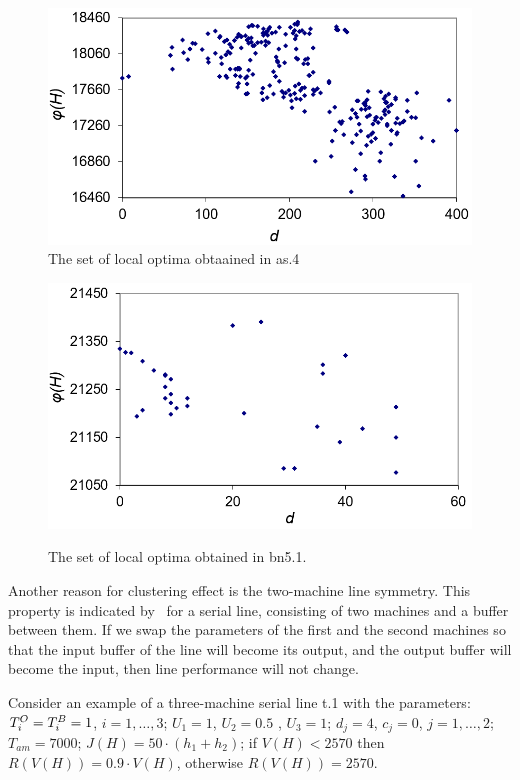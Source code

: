 \documentclass{ifacconf}
\begin{document}
 \begin{figure}[h!]
	\centering
	\includegraphics[scale=0.5]{multistart_klaster}
  \caption{The set of local optima obtaained in as.4 } \label{fig:multistart_klaster}
  \end{figure}
\begin{figure}[h!]
	\begin{center}
		\includegraphics[scale=0.5]{klaster_bn5_1.png}\\
		\caption{The set of  local optima obtained in bn5.1.} \label{klaster_bn5_1}
	\end{center}
\end{figure} 

Another reason for clustering effect is the two-machine 
line symmetry. This property is indicated by~\cite{LP} for a serial line,
consisting of two machines and a buffer
between them. If we swap the parameters of the first and the second machines so 
that the input buffer of the line will become its output, and the output buffer will become the input, then
line performance will not change.

Consider an example of a three-machine serial line t.1 
with the parameters: ${T^{\rm O}_i=T^{\rm B}_i=1}$, $i = 1,\ldots,3$;
 ${U_1=1}$, ${U_2=0.5}$ , ${U_3=1}$;
 ${d_j=4}$, ${c_j=0}$, $j = 1,\ldots,2$;
 $T_{am}=7000$;
 $J(H)=50\cdot(h_1+h_2)$;
 if $V(H) < 2570$ then $R(V(H))=0.9\cdot V(H)$, otherwise $R(V(H))=2570$.
\end{document}
